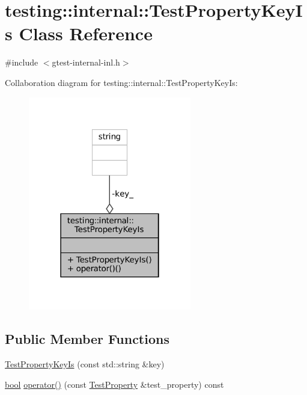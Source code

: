 \hypertarget{classtesting_1_1internal_1_1TestPropertyKeyIs}{}\section{testing\+:\+:internal\+:\+:Test\+Property\+Key\+Is Class Reference}
\label{classtesting_1_1internal_1_1TestPropertyKeyIs}


{\ttfamily \#include $<$gtest-\/internal-\/inl.\+h$>$}



Collaboration diagram for testing\+:\+:internal\+:\+:Test\+Property\+Key\+Is\+:
\nopagebreak
\begin{figure}[H]
\begin{center}
\leavevmode
\includegraphics[width=202pt]{classtesting_1_1internal_1_1TestPropertyKeyIs__coll__graph}
\end{center}
\end{figure}
\subsection*{Public Member Functions}
\begin{DoxyCompactItemize}
\item 
\hyperlink{classtesting_1_1internal_1_1TestPropertyKeyIs_a509ed1271caa1032e40c5d811b3da385}{Test\+Property\+Key\+Is} (const std\+::string \&key)
\item 
\hyperlink{classbool}{bool} \hyperlink{classtesting_1_1internal_1_1TestPropertyKeyIs_abf5eb5bf22065e0614ffe36d093e885e}{operator()} (const \hyperlink{classtesting_1_1TestProperty}{Test\+Property} \&test\+\_\+property) const
\end{DoxyCompactItemize}
